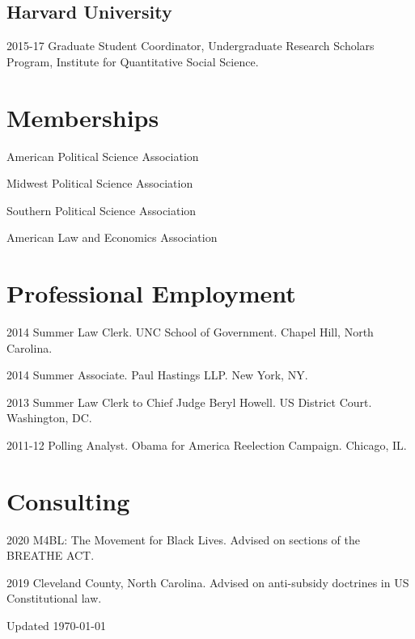 \documentclass[12pt,letterpaper]{report}
\newcommand{\listitemspace}{0.25em}
\renewenvironment{itemize}
{\begin{list}{}{\setlength{\leftmargin}{0em}
                \setlength{\parskip}{0em}
                \setlength{\itemsep}{\listitemspace}
                \setlength{\parsep}{\listitemspace}}}
{\end{list}}
\begin{document}
    \subsection*{Harvard University}
    \begin{tablist}
        \item[2015-17] \tab{}Graduate Student Coordinator, Undergraduate Research Scholars Program, Institute for Quantitative Social Science.
    \end{tablist}
    
    

    
    
    \section*{Memberships}
    
    \begin{itemize}
    \item American Political Science Association
    \item Midwest Political Science Association
    \item Southern Political Science Association
    \item American Law and Economics Association    
    \end{itemize}
    
    \section*{Professional Employment}

    \begin{tablist}
    \item[2014] \tab{}Summer Law Clerk. UNC School of Government. Chapel Hill, North Carolina.
    \item[2014] \tab{}Summer Associate. Paul Hastings LLP. New York, NY.
    \item[2013] \tab{}Summer Law Clerk to Chief Judge Beryl Howell. US District Court. Washington, DC. 
    \item[2011-12] \tab{}Polling Analyst. Obama for America Reelection Campaign. Chicago, IL.
    \end{tablist}
    
    \section*{Consulting}
    \begin{tablist}
    \item[2020] \tab{}M4BL: The Movement for Black Lives. Advised on sections of the BREATHE ACT.
    \item[2019] \tab{}Cleveland County, North Carolina. Advised on anti-subsidy doctrines in US Constitutional law.
    \end{tablist}


    \begin{center}
        \vfill
        Updated \monthyeardate\today
    \end{center}
\end{document}
